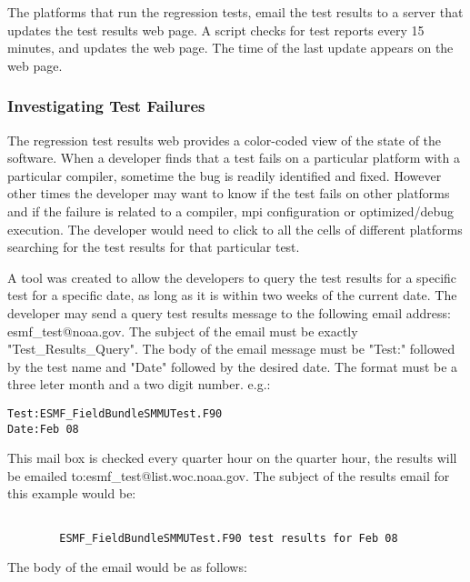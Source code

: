 The platforms that run the regression tests, email the test results to a server that updates the test results web page. A script checks for test reports every 15 minutes, and updates the web page. The time of the last update appears on the web page.

\subsubsection{Investigating Test Failures}
The regression test results web
 provides a color-coded view of the state of the software.
When a developer finds that a test fails on a particular platform with a particular compiler, sometime the bug is readily identified and fixed.
However other times the developer may want to know if the test fails on other platforms and if the failure is related to a compiler, mpi configuration or optimized/debug execution.
The developer would need to click to all the cells of different platforms searching for the test results for that particular test.

A tool was created to allow the developers to query the test results for a specific test for a specific date, as long as it is within two weeks of the current date.
The developer may send a query test results message to the following email address: esmf\_test@noaa.gov.
The subject of the email must be exactly "Test\_Results\_Query". The body of the email message must be "Test:" followed by the test name and "Date" followed by the desired date. The format must be a three leter month and a two digit number. e.g.:

\begin{verbatim}
Test:ESMF_FieldBundleSMMUTest.F90
Date:Feb 08
\end{verbatim}

This mail box is checked every quarter hour on the quarter hour, the results will be emailed to:esmf\_test@list.woc.noaa.gov.
The subject of the results email for this example would be:
\begin{verbatim}

        ESMF_FieldBundleSMMUTest.F90 test results for Feb 08

\end{verbatim}

The body of the email would be as follows:

